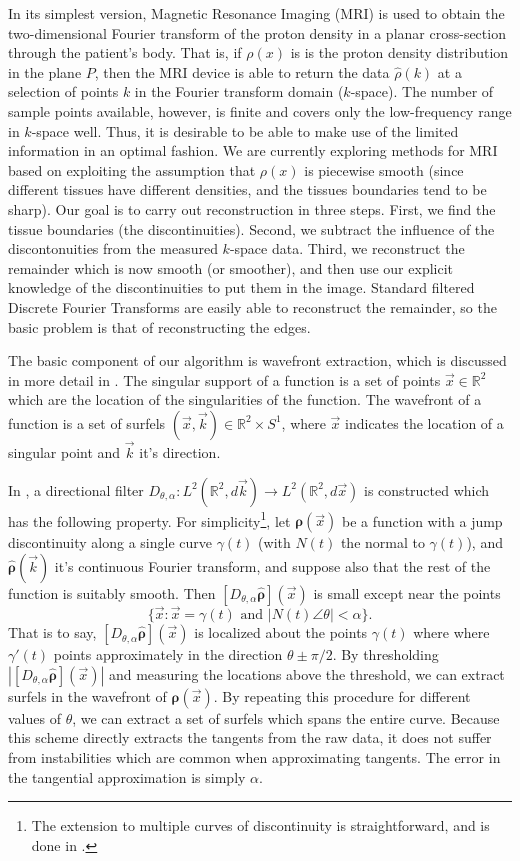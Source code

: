 \documentclass{article}
\numberwithin{cntr}{section}
\numberwithin{equation}{section}
\newcommand{\abs}[1]{\left| #1 \right|}%
\newcommand{\RR}[0]{{\mathbb{R}}}
\newcommand{\vx}[0]{{\vec{x}}}
\newcommand{\vk}[0]{{\vec{k}}}
\newcommand{\dfilter}[2]{{D_{#1,#2}}}
\newcommand{\Img}{{\bm{\rho}}}
\newcommand{\Imgk}{\widehat{\Img}}
\begin{document}
In its simplest version, Magnetic Resonance Imaging (MRI) is used to obtain the two-dimensional Fourier transform of the proton density in a planar cross-section through the patient's body. That is, if $\rho(x)$ is is the proton density distribution in the plane $P$, then the MRI device is able to return the data $\hat{\rho}(k)$ at a selection of points $k$ in the Fourier transform domain ($k$-space). The number of sample points available, however, is finite and covers only the low-frequency range in $k$-space well. Thus, it is desirable to be able to make use of the limited information in an optimal fashion. We are currently exploring methods for MRI based on exploiting the assumption that $\rho(x)$ is piecewise smooth (since different tissues have different densities, and the tissues boundaries tend to be sharp). Our goal is to carry out reconstruction in three steps. First, we find the tissue boundaries (the discontinuities). Second, we subtract the influence of the discontonuities from the measured $k$-space data. Third, we reconstruct the remainder which is now smooth (or smoother), and then use our explicit knowledge of the discontinuities to put them in the image. Standard filtered Discrete Fourier Transforms are easily able to reconstruct the remainder, so the basic problem is that of reconstructing the edges.

The basic component of our algorithm is wavefront extraction, which is discussed in more detail in \cite{WAVEFRONT}. The singular support of a function is a set of points $\vx \in \RR^{2}$ which are the location of the singularities of the function. The wavefront of a function is a set of surfels $(\vx, \vk) \in \RR^{2} \times S^{1}$, where $\vx$ indicates the location of a singular point and $\vk$ it's direction.

In \cite{WAVEFRONT}, a directional filter $\dfilter{\theta}{\alpha}: L^{2}(\RR^{2}, d\vk) \rightarrow L^{2}(\RR^{2}, d\vx)$ is constructed which has the following property. For simplicity\footnote{The extension to multiple curves of discontinuity is straightforward, and is done in \cite{WAVEFRONT}.}, let $\Img(\vx)$ be a function with a jump discontinuity along a single curve $\gamma(t)$ (with $N(t)$ the normal to $\gamma(t)$), and $\Imgk(\vk)$ it's continuous Fourier transform, and suppose also that the rest of the function is suitably smooth. Then $[\dfilter{\theta}{\alpha} \Imgk](\vx)$ is small except near the points
\begin{equation*}
  \{ \vx : \vx = \gamma(t) \textrm{ and } \abs{N(t) \angle \theta} < \alpha \}.
\end{equation*}
That is to say, $[\dfilter{\theta}{\alpha} \Imgk](\vx)$ is localized about the points $\gamma(t)$ where where $\gamma'(t)$ points approximately in the direction $\theta \pm \pi/2$. By thresholding $\abs{[\dfilter{\theta}{\alpha} \Imgk](\vx)}$ and measuring the locations above the threshold, we can extract surfels in the wavefront of $\Img(\vx)$. By repeating this procedure for different values of $\theta$, we can extract a set of surfels which spans the entire curve. Because this scheme directly extracts the tangents from the raw data, it does not suffer from instabilities which are common when approximating tangents. The error in the tangential approximation is simply $\alpha$.
\end{document}
